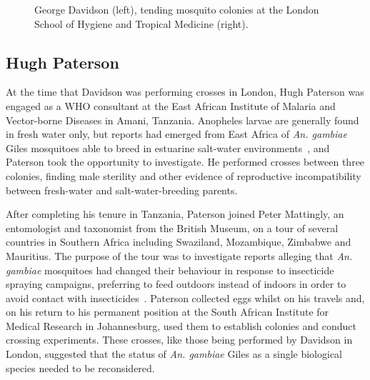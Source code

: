 \documentclass[a4paper,11pt,abstracton,hidelinks]{scrartcl}
\begin{document}
\begin{figure}[t]
\begin{subfigure}[t]{0.57\textwidth}
\end{subfigure}
\caption{George Davidson (left), tending mosquito colonies at the London School of Hygiene and Tropical Medicine (right).}
\label{fig:davidson}
\end{figure}


\subsection{Hugh Paterson}\label{subsec:hugh-paterson}

At the time that Davidson was performing crosses in London, Hugh Paterson was engaged as a WHO consultant at the East African Institute of Malaria and Vector-borne Diseases in Amani, Tanzania.
%
Anopheles larvae are generally found in fresh water only, but reports had emerged from East Africa of \textit{An. gambiae} Giles mosquitoes able to breed in estuarine salt-water environments~\parencite{DeMeillon1947,MuirheadThomson1948}, and Paterson took the opportunity to investigate.
%
He performed crosses between three colonies, finding male sterility and other evidence of reproductive incompatibility between fresh-water and salt-water-breeding parents.

After completing his tenure in Tanzania, Paterson joined Peter Mattingly, an entomologist and taxonomist from the British Museum, on a tour of several countries in Southern Africa including Swaziland, Mozambique, Zimbabwe and Mauritius.
%
The purpose of the tour was to investigate reports alleging that \textit{An. gambiae} mosquitoes had changed their behaviour in response to insecticide spraying campaigns, preferring to feed outdoors instead of indoors in order to avoid contact with insecticides~\parencite{Mattingly1963}.
%
Paterson collected eggs whilst on his travels and, on his return to his permanent position at the South African Institute for Medical Research in Johannesburg, used them to establish colonies and conduct crossing experiments.
%
These crosses, like those being performed by Davidson in London, suggested that the status of \textit{An. gambiae} Giles as a single biological species needed to be reconsidered.
\end{document}
